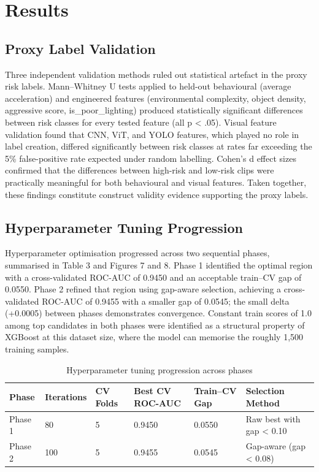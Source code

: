\documentclass[11pt,a4paper]{article}
\begin{document}
\section{Results}

\subsection{Proxy Label Validation}

Three independent validation methods ruled out statistical artefact in the proxy risk labels. Mann--Whitney U tests applied to held-out behavioural (average acceleration) and engineered features (environmental complexity, object density, aggressive score, is\_poor\_lighting) produced statistically significant differences between risk classes for every tested feature (all p < .05). Visual feature validation found that CNN, ViT, and YOLO features, which played no role in label creation, differed significantly between risk classes at rates far exceeding the 5\% false-positive rate expected under random labelling. Cohen's d effect sizes confirmed that the differences between high-risk and low-risk clips were practically meaningful for both behavioural and visual features. Taken together, these findings constitute construct validity evidence supporting the proxy labels.

\subsection{Hyperparameter Tuning Progression}

Hyperparameter optimisation progressed across two sequential phases, summarised in Table 3 and Figures 7 and 8. Phase 1 identified the optimal region with a cross-validated ROC-AUC of 0.9450 and an acceptable train--CV gap of 0.0550. Phase 2 refined that region using gap-aware selection, achieving a cross-validated ROC-AUC of 0.9455 with a smaller gap of 0.0545; the small delta (+0.0005) between phases demonstrates convergence. Constant train scores of 1.0 among top candidates in both phases were identified as a structural property of XGBoost at this dataset size, where the model can memorise the roughly 1,500 training samples.

\begin{table}[H]
\centering\small
\caption{Hyperparameter tuning progression across phases}
\begin{tabularx}{\textwidth}{LLLLLL}
\toprule
\textbf{Phase} & \textbf{Iterations} & \textbf{CV Folds} & \textbf{Best CV ROC-AUC} & \textbf{Train--CV Gap} & \textbf{Selection Method} \\
\midrule
Phase 1 & 80 & 5 & 0.9450 & 0.0550 & Raw best with gap < 0.10 \\
Phase 2 & 100 & 5 & 0.9455 & 0.0545 & Gap-aware (gap < 0.08) \\
\bottomrule
\end{tabularx}
\end{table}
\end{document}
